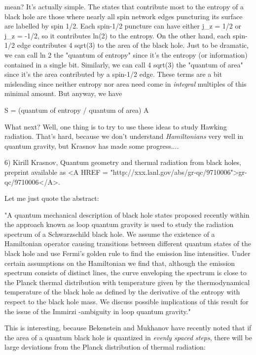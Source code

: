 mean?  It's actually simple.  The states that contribute most to the
entropy of a black hole are those where nearly all spin network edges
puncturing its surface are labelled by spin 1/2.  Each spin-1/2 puncture
can have either j_{z} = 1/2 or j_{z} = -1/2, so it contributes ln(2) to the
entropy.  On the other hand, each spin-1/2 edge contributes 4 \pi  \gamma 
sqrt(3) to the area of the black hole.  Just to be dramatic, we can call
ln 2 the "quantum of entropy" since it's the entropy (or information)
contained in a single bit.  Similarly, we can call 4 \pi  \gamma  sqrt(3)
the "quantum of area" since it's the area contributed by a spin-1/2
edge.  These terms are a bit misleading since neither entropy nor area
need come in \emph{integral} multiples of this minimal amount.  But anyway,
we have

          S = (quantum of entropy / quantum of area) A

What next?  Well, one thing is to try to use these ideas to study
Hawking radiation.  That's hard, because we don't understand
\emph{Hamiltonians} very well in quantum gravity, but Krasnov has made some
progress....

6) Kirill Krasnov, Quantum geometry and thermal radiation from black holes,
preprint available as <A HREF = "http://xxx.lanl.gov/abs/gr-qc/9710006">gr-qc/9710006</A>.

Let me just quote the abstract:

"A quantum mechanical description of black hole states proposed recently
within the approach known as loop quantum gravity is used to study the
radiation spectrum of a Schwarzschild black hole. We assume the
existence of a Hamiltonian operator causing transitions between
different quantum states of the black hole and use Fermi's golden rule
to find the emission line intensities. Under certain assumptions on the
Hamiltonian we find that, although the emission spectrum consists of
distinct lines, the curve enveloping the spectrum is close to the Planck
thermal distribution with temperature given by the thermodynamical
temperature of the black hole as defined by the derivative of the
entropy with respect to the black hole mass. We discuss possible
implications of this result for the issue of the Immirzi \gamma -ambiguity
in loop quantum gravity."

This is interesting, because Bekenstein and Mukhanov have recently
noted that if the area of a quantum black hole is quantized
in \emph{evenly spaced steps}, there will be large deviations from the Planck
distribution of thermal radiation:


